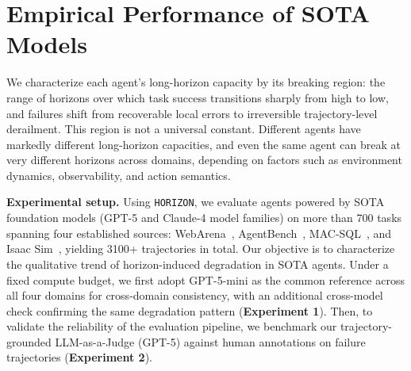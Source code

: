 \documentclass[11pt]{article}
\begin{document}
\section{Empirical Performance of SOTA Models} \label{sec:5}
We characterize each agent's long-horizon capacity by its breaking region: the range of horizons over which task success transitions sharply from high to low, and failures shift from recoverable local errors to irreversible trajectory-level derailment. This region is not a universal constant. Different agents have markedly different long-horizon capacities, and even the same agent can break at very different horizons across domains, depending on factors such as environment dynamics, observability, and action semantics. 




\textbf{Experimental setup.}
Using \texttt{HORIZON}, we evaluate agents powered by SOTA foundation models (GPT-5 and Claude-4 model families) on more than 700 tasks spanning four established sources: WebArena~\citep{zhou2023webarena}, AgentBench~\citep{liu2023agentbench}, MAC-SQL~\citep{wang2025macsqlmultiagentcollaborativeframework}, and Isaac Sim~\citep{kachaev2025mind}, yielding 3100+ trajectories in total. 
Our objective is to characterize the qualitative trend of horizon-induced degradation in SOTA agents. 
Under a fixed compute budget, we first adopt GPT-5-mini as the common reference across all four domains for cross-domain consistency, with an additional cross-model check confirming the same degradation pattern (\textbf{Experiment 1}). 
Then, to validate the reliability of the evaluation pipeline, we benchmark our trajectory-grounded LLM-as-a-Judge (GPT-5) against human annotations on failure trajectories (\textbf{Experiment 2}). 
\end{document}
